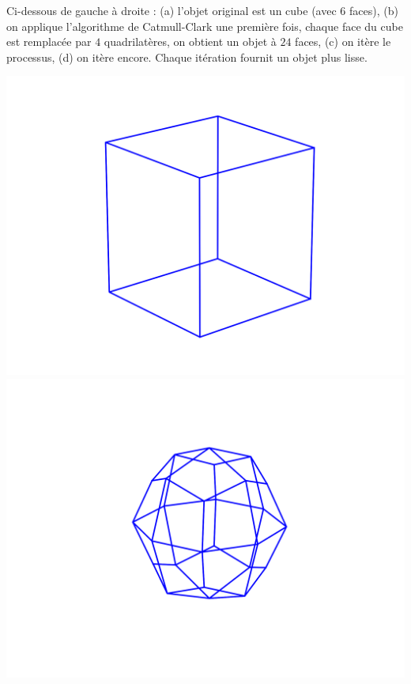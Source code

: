 \documentclass[11pt,class=report,crop=false]{standalone}
\begin{document}
Ci-dessous de gauche à droite : (a) l'objet original est un cube (avec 6 faces), (b) on applique l'algorithme de Catmull-Clark une première fois, chaque face du cube est remplacée par $4$ quadrilatères, on obtient un objet à $24$ faces, (c) on itère le processus, (d) on itère encore. Chaque itération fournit un objet plus lisse.


\begin{center}
	\hspace*{-10mm}
	\includegraphics[scale=\myscale,scale=0.5,trim={4cm 0 3cm 0},clip,]{figures/catmull-clark-cube-0}
	\includegraphics[scale=\myscale,scale=0.5,trim={4cm 0 4cm 0},clip,]{figures/catmull-clark-cube-1}    

\end{center}
\end{document}
